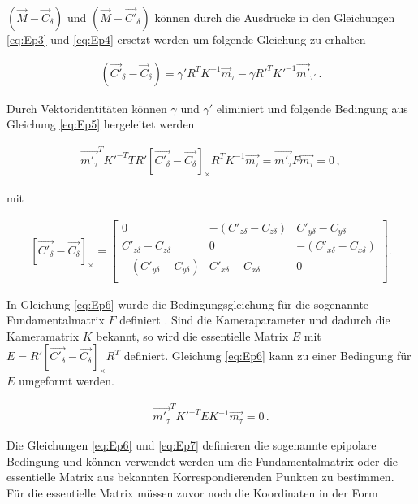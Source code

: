 $(\overrightarrow{M}-\overrightarrow{C}_\delta)$ und $(\overrightarrow{M} - \overrightarrow{C'}_\delta)$ können durch die Ausdrücke in den Gleichungen \ref{eq:Ep3} und \ref{eq:Ep4} ersetzt werden um folgende Gleichung zu erhalten

\begin{gather}
	(\overrightarrow{C'}_\delta - \overrightarrow{C}_\delta) = \gamma' R^TK^{-1}\overrightarrow{m}_\tau - \gamma R'^TK'^{-1}\overrightarrow{m'}_{\tau'} \, . \label{eq:Ep5}
\end{gather}

Durch Vektoridentitäten können $\gamma$ und $\gamma'$ eliminiert und folgende Bedingung aus Gleichung \ref{eq:Ep5} hergeleitet werden \cite{Bronstein,Elements} %

\begin{gather}
	\overrightarrow{m'_\tau}^TK'^{-T}TR' \left[ \overrightarrow{C'_\delta}-\overrightarrow{C_\delta}\right]_\times R^TK^{-1}\overrightarrow{m_\tau}=\overrightarrow{m'_\tau}F\overrightarrow{m_\tau} = 0 \, ,\label{eq:Ep6}
\end{gather}

mit  

\begin{gather}
	\left[\overrightarrow{C'_\delta}-\overrightarrow{C_\delta}\right]_\times=
	\begin{bmatrix}0&-(C'_{z\delta}-C_{z\delta})&C'_{y\delta}-C_{y\delta}\\
		C'_{z\delta}-C_{z\delta}&0&-(C'_{x\delta}-C_{x\delta})\\
		-(C'_{y\delta}-C_{y\delta})&C'_{x \delta}-C_{x\delta}&0\\
	\end{bmatrix}.
\end{gather}

In Gleichung \ref{eq:Ep6} wurde die Bedingungsgleichung für die sogenannte Fundamentalmatrix $F$ definiert \cite{Hoffmann}. Sind die Kameraparameter und dadurch die Kameramatrix $K$ bekannt, so wird die essentielle Matrix $E$  mit $E=R' \left[ \overrightarrow{C'_\delta}-\overrightarrow{C_\delta}\right]_\times R^T$ definiert. Gleichung \ref{eq:Ep6} kann zu einer Bedingung für $E$ umgeformt werden.

\begin{gather}
	\overrightarrow{m'_\tau}^TK'^{-T}EK^{-1}\overrightarrow{m_\tau} = 0 \, .\label{eq:Ep7}
\end{gather}

Die Gleichungen \ref{eq:Ep6} und \ref{eq:Ep7} definieren die sogenannte epipolare Bedingung\cite{HZ,Hoffmann} und können verwendet werden um die Fundamentalmatrix oder die essentielle Matrix aus bekannten Korrespondierenden Punkten zu bestimmen. Für die essentielle Matrix müssen zuvor noch die Koordinaten in der Form

